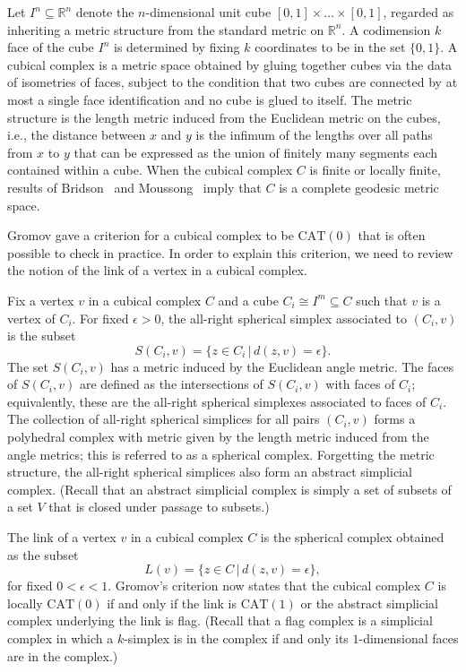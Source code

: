 \documentclass[a4paper,11pt]{article}
\newcommand{\CAT}{\textrm{CAT}}
\begin{document}
Let $I^n \subseteq \mathbb{R}^n$ denote the $n$-dimensional unit cube $[0,1] \times \ldots \times [0,1]$, regarded as inheriting a metric structure from the standard metric on $\mathbb{R}^n$.
A codimension $k$ face of the cube $I^n$ is determined by fixing $k$ coordinates to be in the set $\{0,1\}$.
A cubical complex is a metric space obtained by gluing together cubes via the data of isometries of faces, subject to the condition that two cubes are connected by at most a single face identification and no cube is glued to itself.
The metric structure is the length metric induced from the Euclidean metric on the cubes, i.e., the distance between $x$ and $y$ is the infimum of the lengths over all paths from $x$ to $y$ that can be expressed as the union of finitely many segments each contained within a cube.
When the cubical complex $C$ is finite or locally finite, results of Bridson~\cite{bridson91} and Moussong~\cite{moussong} imply that $C$ is a complete geodesic metric space.

Gromov gave a criterion for a cubical complex to be $\CAT(0)$ that is often possible to check in practice.
In order to explain this criterion, we need to review the notion of the link of a vertex in a cubical complex.

Fix a vertex $v$ in a cubical complex $C$ and a cube $C_i \cong I^m \subseteq C$ such that $v$ is a vertex of $C_i$.
For fixed $\epsilon > 0$, the all-right spherical simplex associated to $(C_i,v)$ is the subset 
\[
S(C_i,v) = \{z \in C_i \, | \, d(z,v) = \epsilon\}.
\]
The set $S(C_i,v)$ has a metric induced by the Euclidean angle metric.
The faces of $S(C_i,v)$ are defined as the intersections of $S(C_i,v)$ with faces of $C_i$; equivalently, these are the all-right spherical simplexes associated to faces of $C_i$.
The collection of all-right spherical simplices for all pairs $(C_i, v)$ forms a polyhedral complex with metric given by the length metric induced from the angle metrics; this is referred to as a spherical complex.
Forgetting the metric structure, the all-right spherical simplices also form an abstract simplicial complex. (Recall that an abstract simplicial complex is simply a set of subsets of a set $V$ that is closed under passage to subsets.)

The link of a vertex $v$ in a cubical complex $C$ is the spherical
complex obtained as the subset  
\[
L(v) = \{z \in C \, | \, d(z,v) = \epsilon\},
\]
for fixed $0 < \epsilon < 1$.
Gromov's criterion now states that the cubical complex $C$ is locally $\CAT(0)$ if and only if the link is $\CAT(1)$ or the abstract simplicial complex underlying the link is flag.
(Recall that a flag complex is a simplicial complex in which a $k$-simplex is in the complex if and only its $1$-dimensional faces are in the complex.)
\end{document}
